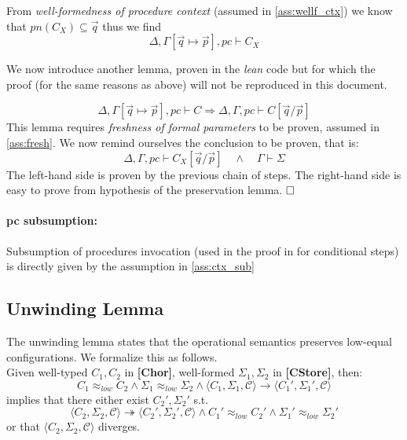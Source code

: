 \documentclass[12pt,a4paper,twoside]{book}
\newcommand{\qed}{\hfill\square}
\begin{document}
From \emph{well-formedness of procedure context} (assumed in \ref{ass:wellf_ctx})
we know that $pn(C_X) \subseteq \vec{q}$ thus we find
$$
\Delta,\Gamma[\vec{q}\mapsto\vec{p}],pc \vdash C_X
$$

We now introduce another lemma, proven in the \emph{lean} code but for which the proof (for the same reasons as above) will not be reproduced in this document.\label{aux:pres_lemma1}

\begin{equation*}
\Delta, \Gamma[\vec{q}\mapsto\vec{p}], pc \vdash C \Rightarrow
\Delta, \Gamma, pc \vdash C[\vec{q}/\vec{p}]
\end{equation*}
This lemma requires \emph{freshness of formal parameters} to be proven, assumed in \ref{ass:fresh}.
We now remind ourselves the conclusion to be proven, that is:
$$
\Delta, \Gamma, pc \vdash C_X[\vec{q}/\vec{p}]\quad\land\quad \Gamma \vdash \Sigma
$$
The left-hand side is proven by the previous chain of steps.
The right-hand side is easy to prove from hypothesis of the preservation lemma.
$\qed$

\paragraph{pc subsumption:}
Subsumption of procedures invocation (used in the proof in \cite{myers2011proving} for conditional steps) is directly given by the assumption in \ref{ass:ctx_sub}

\subsection{Unwinding Lemma}
The unwinding lemma states that the operational semantics preserves low-equal configurations. We formalize this as follows.\\
Given well-typed $C_1,C_2$ in \textbf{[Chor]}, well-formed $\Sigma_1, \Sigma_2$ in \textbf{[CStore]}, then:
$$
C_1 \approx_{low} C_2 \land
\Sigma_1 \approx_{low} \Sigma_2 \land
\langle C_1, \Sigma_1, \mathscr{C} \rangle \rightarrow
\langle C_1', \Sigma_1', \mathscr{C} \rangle
$$
implies that there either exist $C_2',\Sigma_2'$ s.t.
\begin{equation}\label{aux:unw}
\langle C_2, \Sigma_2, \mathscr{C} \rangle \twoheadrightarrow
\langle C_2', \Sigma_2', \mathscr{C} \rangle
\land C_1' \approx_{low} C_2'
\land \Sigma_1' \approx_{low} \Sigma_2'
\end{equation}
or that $\langle C_2, \Sigma_2, \mathscr{C}\rangle$ diverges.
\end{document}
